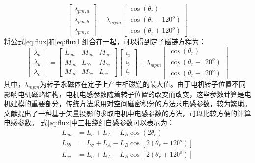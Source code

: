\begin{equation}\label{eq:flux1}
\begin{bmatrix}\lambda_{pm,a}\\\lambda_{pm,b}\\\lambda_{pm,c}\end{bmatrix}
=
\lambda_{mpm}\begin{bmatrix}\cos(\theta_{r})\\\cos(\theta_{r}-120^{o})\\\cos(\theta_{r}+120^{o})\end{bmatrix} 
\end{equation}
将公式\ref{eq:flux}和\ref{eq:flux1}组合在一起，可以得到定子磁链方程为：
\begin{equation}\label{eq:flux2}
\begin{bmatrix}
\lambda_{a}\\\lambda_{b}\\\lambda_{c}
\end{bmatrix}
=
\begin{bmatrix}
L_{aa}&M_{ab}&M_{ac}\\M_{ab}&L_{bb}&M_{bc}\\M_{ac}&M_{bc}&L_{cc}
\end{bmatrix}
\begin{bmatrix}
i_{a}\\i_{b}\\i_{c}
\end{bmatrix}
+
\lambda_{mpm}\begin{bmatrix}\cos(\theta_{r})\\\cos(\theta_{r}-120^{o})\\\cos(\theta_{r}+120^{o})\end{bmatrix}
\end{equation}
其中，$\lambda_{mpm}$为转子永磁体在定子上产生相磁链的最大值。由于电机转子位置不同影响电机磁路结构，电机电感参数随着转子位置的改变而改变，这些参数计算是电机建模的重要部分，传统方法采用对空间磁密积分的方法\cite{krause2013analysis}求电感参数，较为繁琐。文献\cite{lu2011simple}提出了一种基于矢量投影的求取电机中电感参数的方法，可以比较方便的计算电感参数。
式\ref{eq:flux}中三相绕组自感参数可以表示为：
\begin{align}
L_{aa}&= L_{\sigma}+L_{A}-L_{B}\cos(2\theta_{r})\label{eq:Laa}\\
L_{bb}&= L_{\sigma}+L_{A}-L_{B}\cos[2(\theta_{r}-120^{o})]\label{eq:Lbb}\\ 
L_{cc}&= L_{\sigma}+L_{A}-L_{B}\cos[2(\theta_{r}+120^{o})]\label{eq:Lcc}
\end{align}
